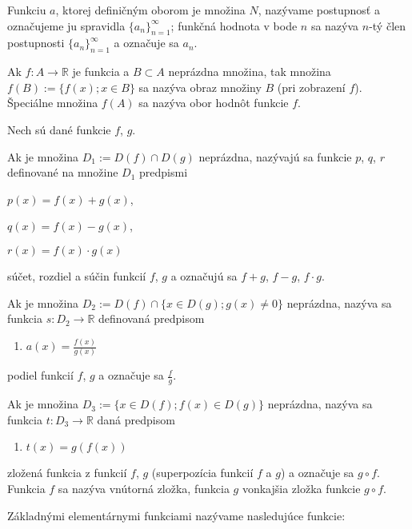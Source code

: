Funkciu $a$, ktorej definičným oborom je množina $N$, nazývame postupnosť a označujeme ju spravidla $\{a_n\}_{n=1}^\infty$; funkčná hodnota v bode $n$ sa nazýva $n$-tý člen postupnosti $\{a_n\}_{n=1}^\infty$ a označuje sa $a_n$.

Ak $f:A \rightarrow \mathbb{R}$ je funkcia a $B \subset A$ neprázdna množina, tak množina $f(B):=\{f(x);x\in B \}$ sa nazýva obraz množiny $B$ (pri zobrazení $f$). Špeciálne množina $f(A)$ sa nazýva obor hodnôt funkcie $f$.

Nech sú dané funkcie $f$, $g$.

\begin{enumerate}
\item Ak je množina $D_1:=D(f)\cap D(g)$ neprázdna, nazývajú sa funkcie $p$, $q$, $r$ definované na množine $D_1$ predpismi
\begin{center}
\item $p(x)=f(x)+g(x)$,
\item $q(x)=f(x)-g(x)$,
\item $r(x)=f(x)\cdot g(x)$
\end{center}
súčet, rozdiel a súčin funkcií $f$, $g$ a označujú sa $f+g$, $f-g$, $f\cdot g$.
\item Ak je množina $D_2:=D(f)\cap \{x\in D(g);g(x)\neq 0\}$ neprázdna, nazýva sa funkcia $s:D_2 \rightarrow \mathbb{R}$ definovaná predpisom 
\begin{enumerate}
\item $a(x)=\frac{f(x)}{g(x)}$
\end{enumerate}
podiel funkcií $f$, $g$ a označuje sa $\frac{f}{g}$.
\item Ak je množina $D_3:=\{x\in D(f);f(x)\in D(g)\}$ neprázdna, nazýva sa funkcia $t:D_3\rightarrow\mathbb{R}$ daná predpisom
\begin{enumerate}
\item $t(x)=g(f(x))$
\end{enumerate}
zložená funkcia z funkcií $f$, $g$ (superpozícia funkcií $f$ a $g$) a označuje sa $g \circ f$. Funkcia $f$ sa nazýva vnútorná zložka, funkcia $g$ vonkajšia zložka funkcie $g \circ f$.
\end{enumerate}

Základnými elementárnymi funkciami nazývame nasledujúce funkcie:
